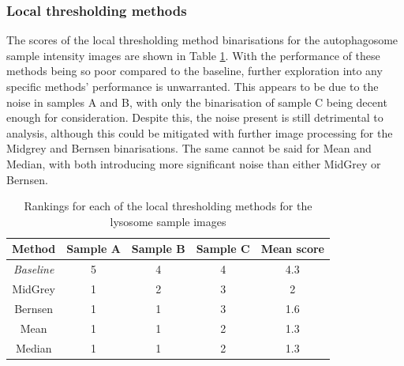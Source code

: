 \subsubsection{Local thresholding methods}
The scores of the local thresholding method binarisations for the autophagosome sample intensity images are shown in Table \ref{tab:auto_local_ranks}. With the performance of these methods being so poor compared to the baseline, further exploration into any specific methods' performance is unwarranted. This appears to be due to the noise in samples A and B, with only the binarisation of sample C being decent enough for consideration. Despite this, the noise present is still detrimental to analysis, although this could be mitigated with further image processing for the Midgrey and Bernsen binarisations. The same cannot be said for Mean and Median, with both introducing more significant noise than either MidGrey or Bernsen.
\begin{table}[hb!]
	\centering
	\begin{tabular}{|c|c|c|c|c|}
		\hline
		\textbf{Method} & \textbf{Sample A} & \textbf{Sample B} & \textbf{Sample C} & \textbf{Mean score} \\
		\hline
		\textit{Baseline} & 5 & 4 & 4 & 4.3 \\
		\hline
		MidGrey & 1 & 2 & 3 & 2 \\
		\hline
		Bernsen & 1 & 1 & 3 & 1.6 \\
		\hline
		Mean & 1 & 1 & 2 & 1.3 \\
		\hline
		Median & 1 & 1 & 2 & 1.3 \\
		\hline
	\end{tabular}
	\caption{Rankings for each of the local thresholding methods for the lysosome sample images}
	\label{tab:auto_local_ranks}
\end{table}

